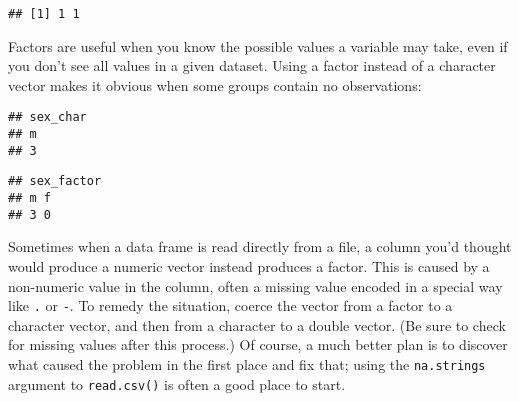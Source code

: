 \begin{Shaded}
\begin{Highlighting}[]
\NormalTok{(}\NormalTok{(}\NormalTok{), }\NormalTok{(}\NormalTok{))}
\end{Highlighting}
\end{Shaded}

\begin{verbatim}
## [1] 1 1
\end{verbatim}

Factors are useful when you know the possible values a variable may
take, even if you don't see all values in a given dataset. Using a
factor instead of a character vector makes it obvious when some groups
contain no observations:

\begin{Shaded}
\begin{Highlighting}[]
\StringTok{ }\NormalTok{(}\NormalTok{, }\NormalTok{, }\NormalTok{)}
\StringTok{ } \NormalTok{(}\NormalTok{, }\NormalTok{))}

\end{Highlighting}
\end{Shaded}

\begin{verbatim}
## sex_char
## m 
## 3
\end{verbatim}

\begin{Shaded}
\begin{Highlighting}[]
\end{Highlighting}
\end{Shaded}

\begin{verbatim}
## sex_factor
## m f 
## 3 0
\end{verbatim}

Sometimes when a data frame is read directly from a file, a column you'd
thought would produce a numeric vector instead produces a factor. This
is caused by a non-numeric value in the column, often a missing value
encoded in a special way like \texttt{.} or \texttt{-}. To remedy the
situation, coerce the vector from a factor to a character vector, and
then from a character to a double vector. (Be sure to check for missing
values after this process.) Of course, a much better plan is to discover
what caused the problem in the first place and fix that; using the
\texttt{na.strings} argument to \texttt{read.csv()} is often a good
place to start.

